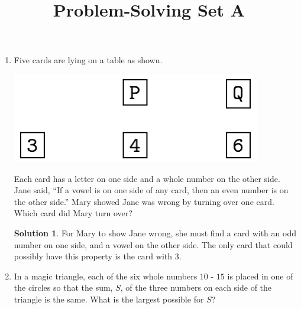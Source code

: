\documentclass{article}
\title{Problem-Solving Set A}
\author{}
\date{}
\theoremstyle{definition}
\newtheorem*{solution}{Solution}
\begin{document}
\maketitle
\begin{multicols*}{2}
    \begin{enumerate}
        \item Five cards are lying on a table as shown.
            \begin{center}
                \includegraphics[scale=0.25]{5-2_cards.png}
            \end{center}
            Each card has a letter on one side and a whole number on the other side.
            Jane said, ``If a vowel is on one side of any card, then an even number is on the other side.''
            Mary showed Jane was wrong by turning over one card.
            Which card did Mary turn over?
            \begin{solution}
                For Mary to show Jane wrong, she must find a card with an odd number on one side, and a vowel on the other side.
                The only card that could possibly have this property is the card with $3$.
            \end{solution}
        \item In a magic triangle, each of the six whole numbers $10$ - $15$ is placed in one of the circles so that the sum, $S$, of the three numbers on each side of the triangle is the same.
            What is the largest possible for $S$?
            \begin{center}
\end{center}
\end{enumerate}
\end{multicols*}
\end{document}
